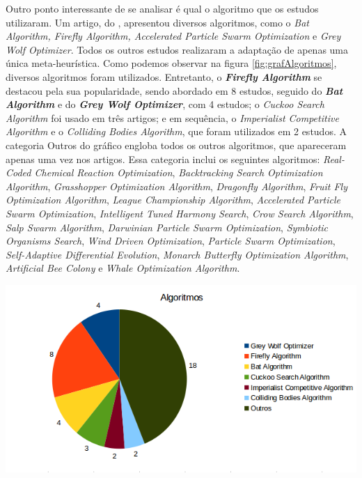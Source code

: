 Outro ponto interessante de se analisar é qual o algoritmo que os estudos utilizaram. Um artigo, do \cite{mitic2}, apresentou diversos algoritmos, como o \textit{Bat Algorithm, Firefly Algorithm, Accelerated Particle Swarm Optimization} e \textit{Grey Wolf Optimizer}. Todos os outros estudos realizaram a adaptação de apenas uma única meta-heurística. Como podemos observar na figura \ref{fig:grafAlgoritmos}, diversos algoritmos foram utilizados. Entretanto, o\textbf{ \textit{Firefly Algorithm}} se destacou pela sua popularidade, sendo abordado em 8 estudos, seguido do \textbf{\textit{Bat Algorithm}} e do \textbf{\textit{Grey Wolf Optimizer}}, com 4 estudos; o \textit{Cuckoo Search Algorithm} foi usado em três artigos; e em sequência, o \textit{Imperialist Competitive Algorithm} e o \textit{Colliding Bodies Algorithm}, que foram utilizados em 2 estudos. A categoria Outros do gráfico engloba todos os outros algoritmos, que apareceram apenas uma vez nos artigos. Essa categoria inclui os seguintes algoritmos: \textit{Real-Coded Chemical Reaction Optimization}, \textit{Backtracking Search Optimization Algorithm}, \textit{Grasshopper Optimization Algorithm}, \textit{Dragonfly Algorithm}, \textit{Fruit Fly Optimization Algorithm}, \textit{League Championship Algorithm}, \textit{Accelerated Particle Swarm Optimization}, \textit{Intelligent Tuned Harmony Search}, \textit{Crow Search Algorithm}, \textit{Salp Swarm Algorithm}, \textit{Darwinian Particle Swarm Optimization}, \textit{Symbiotic Organisms Search}, \textit{Wind Driven Optimization}, \textit{Particle Swarm Optimization}, \textit{Self-Adaptive Differential Evolution}, \textit{Monarch Butterfly Optimization Algorithm}, \textit{Artificial Bee Colony} e \textit{Whale Optimization Algorithm}.

{
    \centering
    \includegraphics[width=0.9\linewidth]{figuras/graficoAlgoritmos2.png}
    \label{fig:grafAlgoritmos}
}


